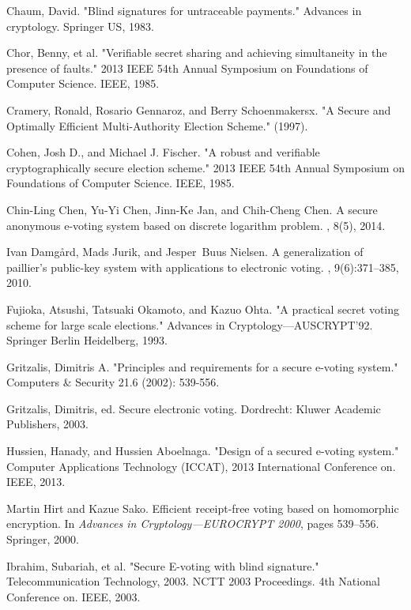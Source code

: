\documentclass[conference]{IEEEtran}
\begin{document}
\begin{thebibliography}{50}
Chaum, David. "Blind signatures for untraceable payments." Advances in cryptology. Springer US, 1983.


Chor, Benny, et al. "Verifiable secret sharing and achieving simultaneity in the presence of faults." 2013 IEEE 54th Annual Symposium on Foundations of Computer Science. IEEE, 1985.

Cramery, Ronald, Rosario Gennaroz, and Berry Schoenmakersx. "A Secure and Optimally Efficient Multi-Authority Election Scheme." (1997).

Cohen, Josh D., and Michael J. Fischer. "A robust and verifiable cryptographically secure election scheme." 2013 IEEE 54th Annual Symposium on Foundations of Computer Science. IEEE, 1985.

Chin-Ling Chen, Yu-Yi Chen, Jinn-Ke Jan, and Chih-Cheng Chen.
\newblock A secure anonymous e-voting system based on discrete logarithm
problem.
, 8(5), 2014.

Ivan Damg{\aa}rd, Mads Jurik, and Jesper~Buus Nielsen.
\newblock A generalization of paillier’s public-key system with applications
to electronic voting.
, 9(6):371--385,
2010.

Fujioka, Atsushi, Tatsuaki Okamoto, and Kazuo Ohta. "A practical secret voting scheme for large scale elections." Advances in Cryptology—AUSCRYPT'92. Springer Berlin Heidelberg, 1993.


 Gritzalis, Dimitris A. "Principles and requirements for a secure e-voting system." Computers \& Security 21.6 (2002): 539-556.

 Gritzalis, Dimitris, ed. Secure electronic voting. Dordrecht: Kluwer Academic Publishers, 2003.

Hussien, Hanady, and Hussien Aboelnaga. "Design of a secured e-voting system." Computer Applications Technology (ICCAT), 2013 International Conference on. IEEE, 2013.

Martin Hirt and Kazue Sako.
\newblock Efficient receipt-free voting based on homomorphic encryption.
\newblock In {\em Advances in Cryptology—EUROCRYPT 2000}, pages 539--556.
Springer, 2000.

Ibrahim, Subariah, et al. "Secure E-voting with blind signature." Telecommunication Technology, 2003. NCTT 2003 Proceedings. 4th National Conference on. IEEE, 2003.


\end{thebibliography}
\end{document}

